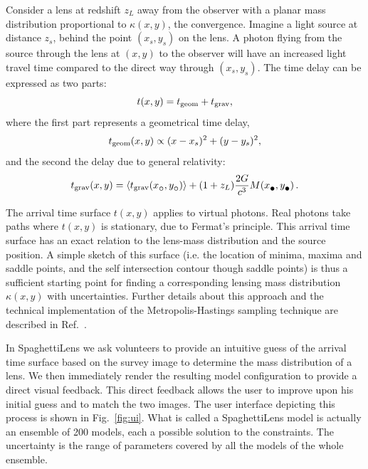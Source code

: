 \documentclass{ws-procs975x65}
\newcommand{\spl}{SpaghettiLens\xspace}
\newcommand{\icite}[1]{Ref.~\refcite{#1}}  %
\newcommand{\figref}[1]{Fig.~\ref{fig:#1}}
\newcommand{\tgeom}{t_{\rm geom}}
\newcommand{\tgrav}{t_{\rm grav}}
\newcommand{\subcirc}{{\lower.33ex\hbox{$\circ$}}}
\newcommand{\subbullet}{{\lower.33ex\hbox{$\bullet$}}}
\begin{document}
Consider a lens at redshift $z_L$ away from the observer with a planar mass distribution proportional to $\kappa(x,y)$, the convergence.
Imagine a light source at distance $z_s$, behind the point $(x_s,y_s)$ on the lens.
A photon flying from the source through the lens at $(x,y)$ to the observer will have an increased light travel time compared to the direct way through $(x_s,y_s)$.
The time delay can be expressed as two parts:
\begin{equation*}  \label{eq:tarriv}
  t(x,y) = t_{\rm geom} + t_{\rm grav} ,
\end{equation*}
where the first part represents a geometrical time delay,
\begin{equation*} \label{eq:tgeom}
  \tgeom(x,y) \propto (x-x_s)^2 + (y-y_s)^2 ,
\end{equation*}
and the second the delay due to general relativity:
\begin{equation*} \label{eq:tgrav}
  \tgrav(x,y) = \left\langle \tgrav(x_\subcirc,y_\subcirc) \right\rangle
                + (1+z_L) \frac{2G}{c^3} M(x_\subbullet,y_\subbullet) \,.
\end{equation*}

The arrival time surface $t(x,y)$ applies to virtual photons.
Real photons take paths where $t(x,y)$ is stationary, due to Fermat's principle.
This arrival time surface has an exact relation to the lens-mass distribution and the source position.
A simple sketch of this surface (i.e. the location of minima, maxima and saddle points, and the self intersection contour though saddle points) is thus a sufficient starting point for finding a corresponding lensing mass distribution $\kappa(x,y)$ with uncertainties. Further details about this approach and the technical implementation of the Metropolis-Hastings sampling technique are described in \icite{Lubini2012}.

In \spl we ask volunteers to provide an intuitive guess of the arrival time surface based on the survey image to determine the mass distribution of a lens.
We then immediately render the resulting model configuration to provide a direct visual feedback.
This direct feedback allows the user to improve upon his initial guess and to match the two images.
The user interface depicting this process is shown in \figref{ui}.
What is called a \spl model is actually an ensemble of 200 models, each a possible solution to the constraints. The uncertainty is the range of parameters covered by all the models of the whole ensemble.
\end{document}
